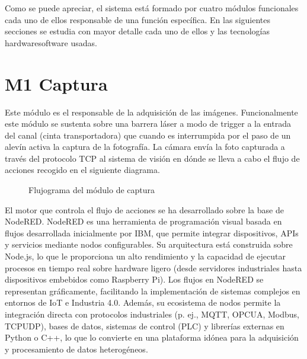 \documentclass[a4paper,10pt,spanish]{jupyterBook}
\begin{document}
\sphinxAtStartPar
Como se puede apreciar, el sistema está formado por cuatro módulos funcionales cada uno de ellos responsable de una función específica. En las siguientes secciones se estudia con mayor detalle cada uno de ellos y las tecnologías hardware\sphinxhyphen{}software usadas.

\sphinxstepscope


\section{M1 \sphinxhyphen{} Captura}
\label{\detokenize{content/01/Modulo-1:m1-captura}}\label{\detokenize{content/01/Modulo-1::doc}}
\sphinxAtStartPar
Este módulo es el responsable de la adquisición de las imágenes. Funcionalmente este módulo se sustenta sobre una barrera láser \sphinxhyphen{} a modo de trigger \sphinxhyphen{} a la entrada del canal (cinta transportadora) que cuando es interrumpida por el paso de un alevín activa la captura de la fotografía. La cámara envía la foto capturada a través del protocolo TCP al sistema de visión en dónde se lleva a cabo el flujo de acciones recogido en el siguiente diagrama.

\begin{figure}[htbp]
\centering
\capstart

\noindent{}
\caption{Flujograma del módulo de captura}\label{\detokenize{content/01/Modulo-1:figura-wp1-imagen-2}}\end{figure}

\sphinxAtStartPar
El motor que controla el flujo de acciones se ha desarrollado sobre la base de Node\sphinxhyphen{}RED. Node\sphinxhyphen{}RED es una herramienta de programación visual basada en flujos desarrollada inicialmente por IBM, que permite integrar dispositivos, APIs y servicios mediante nodos configurables. Su arquitectura está construida sobre Node.js, lo que le proporciona un alto rendimiento y la capacidad de ejecutar procesos en tiempo real sobre hardware ligero (desde servidores industriales hasta dispositivos embebidos como Raspberry Pi). Los flujos en Node\sphinxhyphen{}RED se representan gráficamente, facilitando la implementación de sistemas complejos en entornos de IoT e Industria 4.0. Además, su ecosistema de nodos permite la integración directa con protocolos industriales (p. ej., MQTT, OPC\sphinxhyphen{}UA, Modbus, TCP\sphinxhyphen{}UDP), bases de datos, sistemas de control (PLC) y librerías externas en Python o C++, lo que lo convierte en una plataforma idónea para la adquisición y procesamiento de datos heterogéneos.
\end{document}
